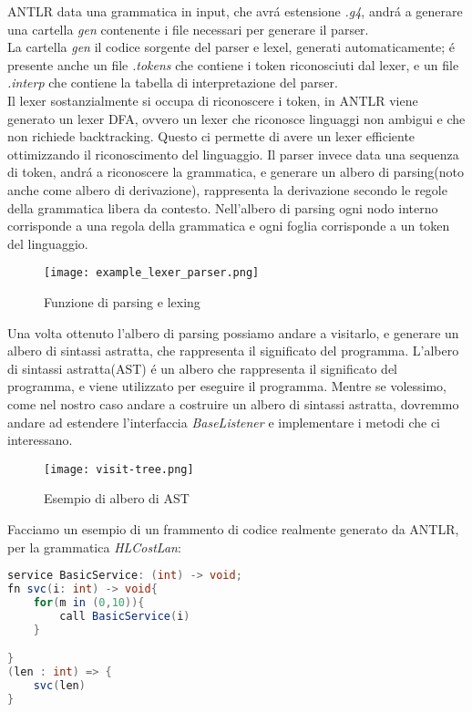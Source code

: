 \documentclass[../../main.tex]{subfiles}
\begin{document}
ANTLR data una grammatica in input, che avrá estensione \textit{.g4}, andrá a generare una cartella \textit{gen} contenente i file necessari per generare il parser.\\
La cartella \textit{gen} il codice sorgente del parser e lexel, generati automaticamente; é presente anche un file \textit{.tokens} che contiene i token riconosciuti dal lexer, e un file \textit{.interp} che contiene la tabella di interpretazione del parser.\\
Il lexer sostanzialmente si occupa di riconoscere i token, in ANTLR viene generato un lexer DFA, ovvero un lexer che riconosce linguaggi non ambigui e che non richiede backtracking. Questo ci permette di avere un lexer efficiente ottimizzando il riconoscimento del linguaggio.
Il parser invece data una sequenza di token, andrá a riconoscere la grammatica, e generare un albero di parsing(noto anche come albero di derivazione), rappresenta la derivazione secondo le regole della grammatica libera da contesto. 
Nell'albero di parsing ogni nodo interno corrisponde a una regola della grammatica e ogni foglia corrisponde a un token del linguaggio.
\begin{figure}[H]
    \centering
    \texttt{[image: example\_lexer\_parser.png]}
    \caption{Funzione di parsing e lexing}
\end{figure}
Una volta ottenuto l'albero di parsing possiamo andare a visitarlo, e generare un albero di sintassi astratta, che rappresenta il significato del programma.
L'albero di sintassi astratta(AST) é un albero che rappresenta il significato del programma, e viene utilizzato per eseguire il programma.
Mentre se volessimo, come nel nostro caso andare a costruire un albero di sintassi astratta, dovremmo andare ad estendere l'interfaccia \textit{BaseListener} e implementare i metodi che ci interessano.\\
\begin{figure}[H]
    \centering
    \texttt{[image: visit-tree.png]}
    \caption{Esempio di albero di AST}
    \label{fig:visit_tree}
\end{figure}

Facciamo un esempio di un frammento di codice realmente generato da ANTLR, per la grammatica \textit{HLCostLan}:
\begin{lstlisting}[language=Java, caption={Esempio di codice HLCostLan: example/Listing6}, label={lst:example_code}]
service BasicService: (int) -> void;
fn svc(i: int) -> void{
    for(m in (0,10)){
        call BasicService(i)
    }

}
(len : int) => {
	svc(len)
}
\end{lstlisting}
\end{document}
